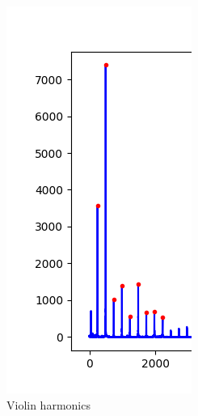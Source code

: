 \documentclass{article}
\begin{document}
\begin{figure}[!htbp]
  \includegraphics[width=\linewidth]{violin-harmonics-cropped.png}
  \caption{Violin harmonics}\label{fig:b2}
\endminipage\hfill
{}%

\end{figure}
\end{document}

